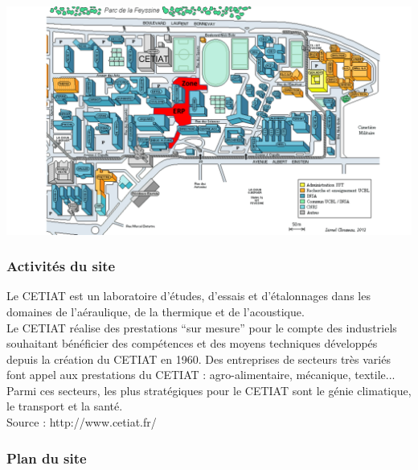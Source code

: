 \documentclass[hidelinks, paper=a4, fontsize=13pt]{report}
\begin{document}
\begin{center}
	\includegraphics[scale=0.9]{Annexes/Plans/Emplacement_CETIAT}
\end{center}

\subsubsection{Activités du site}

Le CETIAT est un laboratoire d'études, d'essais et d'étalonnages dans les domaines de l'aéraulique, de la thermique et de l'acoustique. \\

Le CETIAT réalise des prestations “sur mesure” pour le compte des industriels souhaitant bénéficier des compétences et des moyens techniques développés depuis la création du CETIAT en 1960. Des entreprises de secteurs très variés font appel aux prestations du CETIAT : agro-alimentaire, mécanique, textile... Parmi ces secteurs, les plus stratégiques pour le CETIAT sont le génie climatique, le transport et la santé.\\

Source : http://www.cetiat.fr/

\subsubsection{Plan du site}
\end{document}
